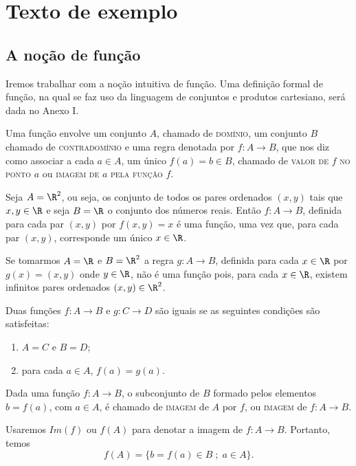 \documentclass{article}
\begin{document}
\begin{singlespacing}\listoftodos\end{singlespacing}




\chapter{Texto de exemplo}
\section{A no\c{c}\~ao de fun\c{c}\~ao}
\indent\indent Iremos trabalhar com a no\c{c}\~ao intuitiva de fun\c{c}\~ao.
Uma defini\c{c}\~ao formal de fun\c{c}\~ao, na qual se faz uso da linguagem de
conjuntos e produtos cartesiano, ser\'a dada no Anexo I.

Uma fun\c{c}\~ao envolve um conjunto $A$, chamado de \textsc{dom\'inio},
um conjunto $B$ chamado de \textsc{contradom\'inio} e uma regra
denotada por $f:A \rightarrow B$, que nos diz como associar a cada
$a \in A$, um \'unico $f(a)=b \in B$, chamado de \textsc{valor de}
$f$ \textsc{no ponto} $a$ ou \textsc{imagem de} $a$ \textsc{pela
fun\c{c}\~ao} $f$.
\begin{example}\label{R2emR}
Seja $A=\R^2$, ou seja, os conjunto de todos os pares ordenados
$(x,y)$ tais que $x,y \in \R$ e seja $B=\R$ o conjunto dos n\'umeros
reais. Ent\~ao $f:A \rightarrow B$, definida para cada par $(x,y)$
por $f(x,y)=x$ \'e uma fun\c{c}\~ao, uma vez que, para cada par $(x,y)$,
corresponde um \'unico $x \in \R$.
\end{example}
\begin{example}
Se tomarmos $A=\R$ e $B=\R^2$ a regra $g:A \rightarrow B$,
definida para cada $x \in \R$ por $g(x)=(x,y)$ onde $y \in \R$,
n\~ao \'e uma fun\c{c}\~ao pois, para cada $x \in \R$, existem infinitos
pares ordenados $(x,y) \in \R^2$.
\end{example}

\begin{definition}
Duas fun\c{c}\~oes $f:A \rightarrow B$ e $g:C \rightarrow D$ s\~ao iguais
se as seguintes condi\c{c}\~oes s\~ao satisfeitas:
\begin{enumerate}
    \item $A=C$ e $B=D$;
    \item para cada $a \in A$, $f(a)=g(a)$.
\end{enumerate}
\end{definition}
\begin{definition}
Dada uma fun\c{c}\~ao $f:A \rightarrow B$, o subconjunto de $B$ formado
pelos elementos $b=f(a)$, com $a \in A$, \'e chamado de
\textsc{imagem} de $A$ por $f$, ou \textsc{imagem} de $f:A
\rightarrow B$.
\end{definition}
Usaremos $Im(f)$ ou $f(A)$ para denotar a imagem de $f:A
\rightarrow B$. Portanto, temos
$$
f(A)=\{b=f(a)\in B\;;\; a \in A\}.
$$
\end{document}
